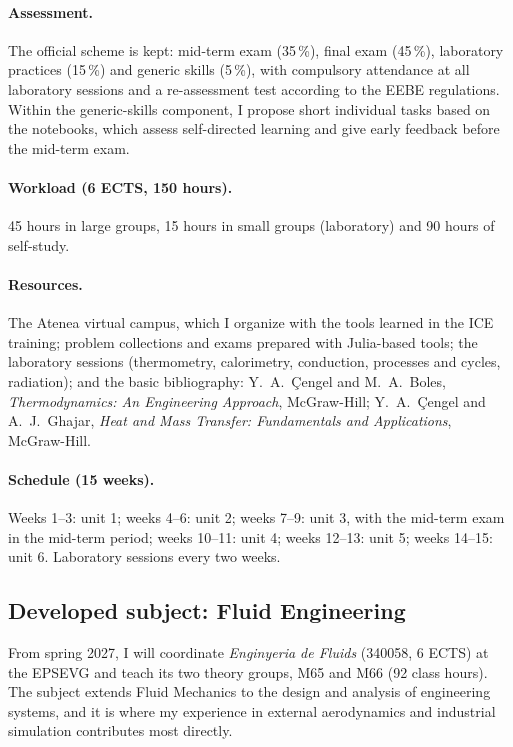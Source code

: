 \documentclass[11pt]{article}
\begin{document}
\paragraph{Assessment.} The official scheme is kept: mid-term exam (35\,\%), final exam
(45\,\%), laboratory practices (15\,\%) and generic skills (5\,\%), with compulsory
attendance at all laboratory sessions and a re-assessment test according to the EEBE
regulations. Within the generic-skills component, I propose short individual tasks based
on the notebooks, which assess self-directed learning and give early feedback before the
mid-term exam.

\paragraph{Workload (6 ECTS, 150 hours).} 45 hours in large groups, 15 hours in small
groups (laboratory) and 90 hours of self-study.

\paragraph{Resources.} The Atenea virtual campus, which I organize with the tools learned
in the ICE training; problem collections and exams prepared with Julia-based tools; the
laboratory sessions (thermometry, calorimetry, conduction, processes and cycles,
radiation); and the basic bibliography: Y.\ A.\ \c{C}engel and M.\ A.\ Boles,
\emph{Thermodynamics: An Engineering Approach}, McGraw-Hill; Y.\ A.\ \c{C}engel and A.\
J.\ Ghajar, \emph{Heat and Mass Transfer: Fundamentals and Applications}, McGraw-Hill.

\paragraph{Schedule (15 weeks).} Weeks 1--3: unit 1; weeks 4--6: unit 2; weeks 7--9:
unit 3, with the mid-term exam in the mid-term period; weeks 10--11: unit 4; weeks
12--13: unit 5; weeks 14--15: unit 6. Laboratory sessions every two weeks.

\subsection{Developed subject: Fluid Engineering}\label{sec:ef}
From spring 2027, I will coordinate \emph{Enginyeria de Fluids} (340058, 6 ECTS) at the
EPSEVG and teach its two theory groups, M65 and M66 (92 class hours). The subject extends
Fluid Mechanics to the design and analysis of engineering systems, and it is where my
experience in external aerodynamics and industrial simulation contributes most directly.
\end{document}
